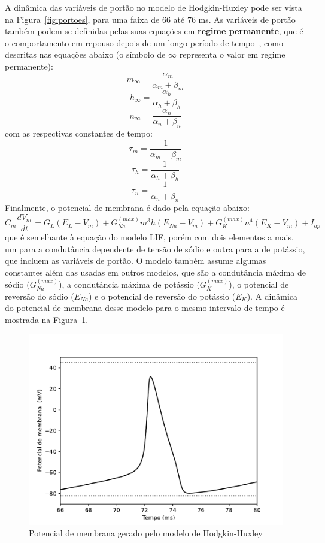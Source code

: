 A dinâmica das variáveis de portão no modelo de Hodgkin-Huxley pode ser vista na Figura~\ref{fig:portoes}, para uma faixa de 66 até 76 ms. As variáveis de portão também podem se definidas pelas suas equações em \textbf{regime permanente}, que é o comportamento em repouso depois de um longo período de tempo~\cite{ermentrout_mathematical_2010}, como descritas nas equações abaixo (o símbolo de $\infty$ representa o valor em regime permanente):
\begin{equation}\label{eq:m_inf}
	m_\infty=\frac{\alpha_m}{\alpha_m+\beta_m}
\end{equation}
\begin{equation}\label{eq:h_inf}
	h_\infty=\frac{\alpha_h}{\alpha_h+\beta_h}
\end{equation}
\begin{equation}\label{eq:n_inf}
	n_\infty=\frac{\alpha_n}{\alpha_n+\beta_n}
\end{equation}
com as respectivas constantes de tempo:
\begin{equation}\label{eq:tau_m}
	\tau_m=\frac{1}{\alpha_m+\beta_m}
\end{equation}
\begin{equation}\label{eq:tau_n}
	\tau_h=\frac{1}{\alpha_h+\beta_h}
\end{equation}
\begin{equation}\label{eq:tau_h}
	\tau_n=\frac{1}{\alpha_n+\beta_n}
\end{equation}
Finalmente, o potencial de membrana é dado pela equação abaixo:
\begin{equation}\label{eq:hodgkin_huxley}
	C_m\frac{dV_m}{dt}=G_L(E_L-V_m)+G_{Na}^{(max)}m^3h(E_{Na}-V_m)+G_K^{(max)}n^4(E_K-V_m)+I_{ap}
\end{equation}
que é semelhante à equação do modelo LIF, porém com dois elementos a mais, um para a condutância dependente de tensão de sódio e outra para a de potássio, que incluem as variáveis de portão. O modelo também assume algumas constantes além das usadas em outros modelos, que são a condutância máxima de sódio ($G_{Na}^{(max)}$), a condutância máxima de potássio ($G_K^{(max)}$), o potencial de reversão do sódio ($E_{Na}$) e o potencial de reversão do potássio ($E_K$). A dinâmica do potencial de membrana desse modelo para o mesmo intervalo de tempo é mostrada na Figura~\ref{fig:hhvm}.

\begin{figure}[tb]
	\centering
	\caption{Potencial de membrana gerado pelo modelo de Hodgkin-Huxley}
	\label{fig:hhvm}
	\includegraphics[width=0.7\linewidth]{figs/hh_vm}
\end{figure}
